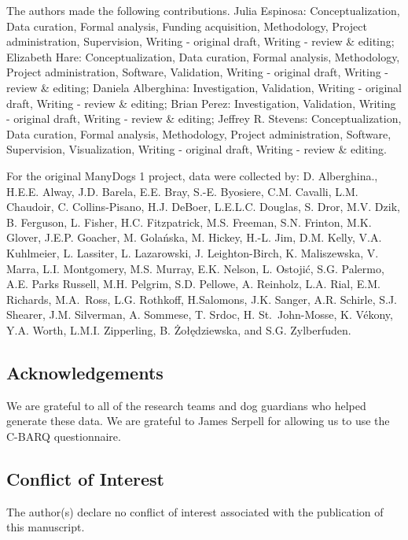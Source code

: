 \documentclass[
  man,floatsintext]{apa6}
\begin{document}
The authors made the following contributions. Julia Espinosa: Conceptualization, Data curation, Formal analysis, Funding acquisition, Methodology, Project administration, Supervision, Writing - original draft, Writing - review \& editing; Elizabeth Hare: Conceptualization, Data curation, Formal analysis, Methodology, Project administration, Software, Validation, Writing - original draft, Writing - review \& editing; Daniela Alberghina: Investigation, Validation, Writing - original draft, Writing - review \& editing; Brian Perez: Investigation, Validation, Writing - original draft, Writing - review \& editing; Jeffrey R. Stevens: Conceptualization, Data curation, Formal analysis, Methodology, Project administration, Software, Supervision, Visualization, Writing - original draft, Writing - review \& editing.

For the original ManyDogs 1 project, data were collected by: D. Alberghina., H.E.E. Alway, J.D. Barela, E.E. Bray, S.-E. Byosiere, C.M. Cavalli, L.M. Chaudoir, C. Collins-Pisano, H.J. DeBoer, L.E.L.C. Douglas, S. Dror, M.V. Dzik, B. Ferguson, L. Fisher, H.C. Fitzpatrick, M.S. Freeman, S.N. Frinton, M.K. Glover, J.E.P. Goacher, M. Golańska, M.
Hickey, H.-L. Jim, D.M. Kelly, V.A. Kuhlmeier, L. Lassiter, L. Lazarowski, J. Leighton-Birch, K. Maliszewska, V. Marra, L.I. Montgomery, M.S. Murray, E.K. Nelson, L. Ostojić, S.G. Palermo, A.E. Parks Russell, M.H. Pelgrim, S.D. Pellowe, A. Reinholz, L.A. Rial, E.M. Richards, M.A.~Ross, L.G. Rothkoff, H.Salomons, J.K. Sanger, A.R. Schirle, S.J. Shearer, J.M. Silverman, A. Sommese, T. Srdoc, H. St.~John-Mosse, K. Vékony, Y.A. Worth, L.M.I. Zipperling, B. Żołędziewska, and S.G. Zylberfuden.

\hypertarget{acknowledgements}{%
\subsection{Acknowledgements}\label{acknowledgements}}

We are grateful to all of the research teams and dog guardians who helped generate these data. We are grateful to James Serpell for allowing us to use the C-BARQ questionnaire.

\hypertarget{conflict-of-interest}{%
\subsection{Conflict of Interest}\label{conflict-of-interest}}

The author(s) declare no conflict of interest associated with the publication of this manuscript.
\end{document}
